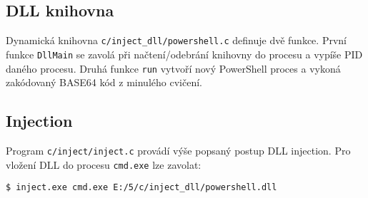 \documentclass[12pt,a4paper]{article}
\begin{document}
\subsection{DLL knihovna}
Dynamická knihovna \texttt{c/inject\_dll/powershell.c} definuje dvě funkce.
První funkce \texttt{DllMain} se zavolá při načtení/odebrání knihovny do procesu a vypíše PID daného procesu.
Druhá funkce \texttt{run} vytvoří nový PowerShell proces a vykoná zakódovaný BASE64 kód z minulého cvičení.


\subsection{Injection}
Program \texttt{c/inject/inject.c} provádí výše popsaný postup DLL injection.
Pro vložení DLL do procesu \texttt{cmd.exe} lze zavolat:
\begin{verbatim}
$ inject.exe cmd.exe E:/5/c/inject_dll/powershell.dll
\end{verbatim}
\end{document}
